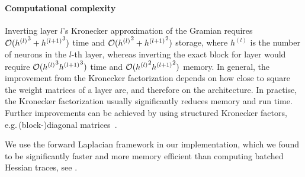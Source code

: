 \paragraph{Computational complexity}
Inverting layer $l$'s Kronecker approximation of the Gramian requires ${\mathcal{O}}({h^{(l)}}^3+{h^{(l+1)}}^3)$ time and ${\mathcal{O}}({h^{(l)}}^2+{h^{(l+1)}}^2)$ storage, where $h^{(l)}$ is the number of neurons in the $l$-th layer, whereas inverting the exact block for layer would require ${\mathcal{O}}({h^{(l)}}^3{h^{(l+1)}}^3)$ time and ${\mathcal{O}}({h^{(l)}}^2 {h^{(l+1)}}^2)$ memory.
In general, the improvement from the Kronecker factorization depends on how close to square the weight matrices of a layer are, and therefore on the architecture.
In practise, the Kronecker factorization usually significantly reduces memory and run time.
Further improvements can be achieved by using structured Kronecker factors, e.g.\,(block-)diagonal matrices~\cite{lin2024structured}.

We use the forward Laplacian framework in our implementation, which we found to be significantly faster and more memory efficient than computing batched Hessian traces, see .

